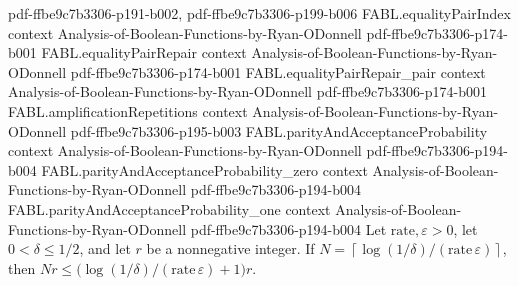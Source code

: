 \begin{theorem}
  {pdf-ffbe9c7b3306-p191-b002,
    pdf-ffbe9c7b3306-p199-b006}
\proofstep
  {FABL.equalityPairIndex}
  {context}
  {Analysis-of-Boolean-Functions-by-Ryan-ODonnell}
  {pdf-ffbe9c7b3306-p174-b001}
\proofstep
  {FABL.equalityPairRepair}
  {context}
  {Analysis-of-Boolean-Functions-by-Ryan-ODonnell}
  {pdf-ffbe9c7b3306-p174-b001}
\proofstep
  {FABL.equalityPairRepair_pair}
  {context}
  {Analysis-of-Boolean-Functions-by-Ryan-ODonnell}
  {pdf-ffbe9c7b3306-p174-b001}
\proofstep
  {FABL.amplificationRepetitions}
  {context}
  {Analysis-of-Boolean-Functions-by-Ryan-ODonnell}
  {pdf-ffbe9c7b3306-p195-b003}
\proofstep
  {FABL.parityAndAcceptanceProbability}
  {context}
  {Analysis-of-Boolean-Functions-by-Ryan-ODonnell}
  {pdf-ffbe9c7b3306-p194-b004}
\proofstep
  {FABL.parityAndAcceptanceProbability_zero}
  {context}
  {Analysis-of-Boolean-Functions-by-Ryan-ODonnell}
  {pdf-ffbe9c7b3306-p194-b004}
\proofstep
  {FABL.parityAndAcceptanceProbability_one}
  {context}
  {Analysis-of-Boolean-Functions-by-Ryan-ODonnell}
  {pdf-ffbe9c7b3306-p194-b004}
Let $\mathrm{rate},\varepsilon>0$, let $0<\delta\le 1/2$, and let $r$ be a nonnegative
integer. If $N=\left\lceil\log(1/\delta)/(\mathrm{rate}\,\varepsilon)\right\rceil$, then
$Nr\le \bigl(\log(1/\delta)/(\mathrm{rate}\,\varepsilon)+1\bigr)r$.
\end{theorem}

